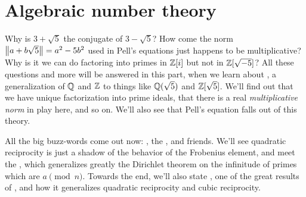 \section{Algebraic number theory}
\begin{itemize}
Why is $3+\sqrt5$ the conjugate of $3-\sqrt5$?
How come the norm $\left\lVert a+b\sqrt5 \right\rVert = a^2-5b^2$ used in Pell's equations
just happens to be multiplicative?
Why is it we can do factoring into primes in $\mathbb Z[i]$
but not in $\mathbb Z[\sqrt{-5}]$?
All these questions and more will be answered in this part,
when we learn about ,
a generalization of $\mathbb Q$ and $\mathbb Z$ to things like $\mathbb Q(\sqrt5)$
and $\mathbb Z[\sqrt{5}]$.
We'll find out that we have unique factorization into prime ideals,
that there is a real \emph{multiplicative norm} in play here,
and so on.
We'll also see that Pell's equation falls out of this theory.

All the big buzz-words come out now:
, the , and friends.
We'll see quadratic reciprocity is just a shadow of
the behavior of the Frobenius element,
and meet the ,
which generalizes greatly the Dirichlet theorem on the infinitude
of primes which are $a \pmod n$.
Towards the end, we'll also state ,
one of the great results of ,
and how it generalizes quadratic reciprocity and cubic reciprocity.
\end{itemize}

